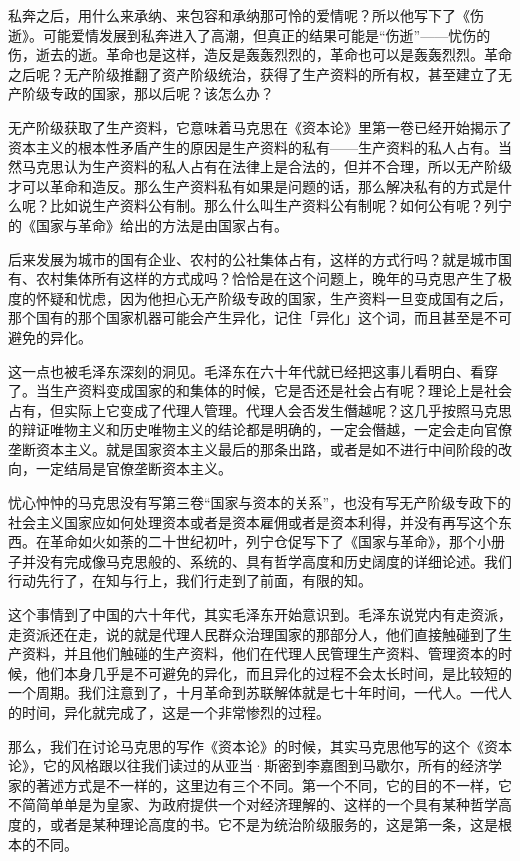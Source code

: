 \documentclass[UTF8, 12pt, a4paper]{ctexrep}
\begin{document}
私奔之后，用什么来承纳、来包容和承纳那可怜的爱情呢？所以他写下了《伤逝》。可能爱情发展到私奔进入了高潮，但真正的结果可能是“伤逝”——忧伤的伤，逝去的逝。革命也是这样，造反是轰轰烈烈的，革命也可以是轰轰烈烈。革命之后呢？无产阶级推翻了资产阶级统治，获得了生产资料的所有权，甚至建立了无产阶级专政的国家，那以后呢？该怎么办？

无产阶级获取了生产资料，它意味着马克思在《资本论》里第一卷已经开始揭示了资本主义的根本性矛盾产生的原因是生产资料的私有——生产资料的私人占有。当然马克思认为生产资料的私人占有在法律上是合法的，但并不合理，所以无产阶级才可以革命和造反。那么生产资料私有如果是问题的话，那么解决私有的方式是什么呢？比如说生产资料公有制。那么什么叫生产资料公有制呢？如何公有呢？列宁的《国家与革命》给出的方法是由国家占有。

后来发展为城市的国有企业、农村的公社集体占有，这样的方式行吗？就是城市国有、农村集体所有这样的方式成吗？恰恰是在这个问题上，晚年的马克思产生了极度的怀疑和忧虑，因为他担心无产阶级专政的国家，生产资料一旦变成国有之后，那个国有的那个国家机器可能会产生异化，记住「异化」这个词，而且甚至是不可避免的异化。

这一点也被毛泽东深刻的洞见。毛泽东在六十年代就已经把这事儿看明白、看穿了。当生产资料变成国家的和集体的时候，它是否还是社会占有呢？理论上是社会占有，但实际上它变成了代理人管理。代理人会否发生僭越呢？这几乎按照马克思的辩证唯物主义和历史唯物主义的结论都是明确的，一定会僭越，一定会走向官僚垄断资本主义。就是国家资本主义最后的那条出路，或者是如不进行中间阶段的改向，一定结局是官僚垄断资本主义。

忧心忡忡的马克思没有写第三卷“国家与资本的关系”，也没有写无产阶级专政下的社会主义国家应如何处理资本或者是资本雇佣或者是资本利得，并没有再写这个东西。在革命如火如荼的二十世纪初叶，列宁仓促写下了《国家与革命》，那个小册子并没有完成像马克思般的、系统的、具有哲学高度和历史阔度的详细论述。我们行动先行了，在知与行上，我们行走到了前面，有限的知。

这个事情到了中国的六十年代，其实毛泽东开始意识到。毛泽东说党内有走资派，走资派还在走，说的就是代理人民群众治理国家的那部分人，他们直接触碰到了生产资料，并且他们触碰的生产资料，他们在代理人民管理生产资料、管理资本的时候，他们本身几乎是不可避免的异化，而且异化的过程不会太长时间，是比较短的一个周期。我们注意到了，十月革命到苏联解体就是七十年时间，一代人。一代人的时间，异化就完成了，这是一个非常惨烈的过程。

那么，我们在讨论马克思的写作《资本论》的时候，其实马克思他写的这个《资本论》，它的风格跟以往我们读过的从亚当·斯密到李嘉图到马歇尔，所有的经济学家的著述方式是不一样的，这里边有三个不同。第一个不同，它的目的不一样，它不简简单单是为皇家、为政府提供一个对经济理解的、这样的一个具有某种哲学高度的，或者是某种理论高度的书。它不是为统治阶级服务的，这是第一条，这是根本的不同。
\end{document}

